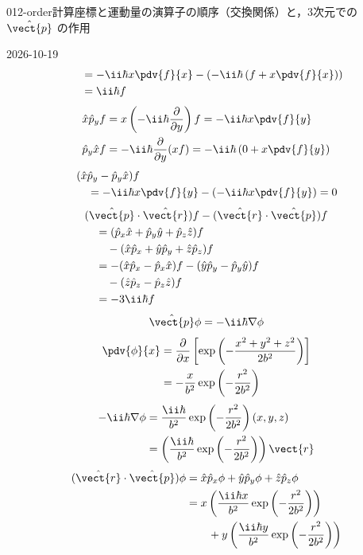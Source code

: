 \documentclass[uplatex,dvipdfmx,a4paper,11pt]{jsarticle}
\begin{document}
\begin{mondai}{012-order}{計算}{座標と運動量の演算子の順序（交換関係）と，3次元での $\hat{\vect{p}}$ の作用}
\begin{kotaeutsushi}{2026-10-19}
\begin{align*}
&\quad=-\ii\hbar x\pdv{f}{x}-\left(-\ii\hbar\left(f+x\pdv{f}{x}\right)\right)\\
&\quad=\ii\hbar f
\end{align*}
\begin{align*}
\hat{x}\hat{p}_{y}f&=x\left(-\ii\hbar\frac{\partial}{\partial y}\right)f=-\ii\hbar x\pdv{f}{y}\\
\hat{p}_{y}\hat{x}f&=-\ii\hbar\frac{\partial}{\partial y}(xf)=-\ii\hbar\left(0+x\pdv{f}{y}\right)
\end{align*}
\begin{align*}
&(\hat{x}\hat{p}_{y}-\hat{p}_{y}\hat{x})f\\
&\quad=-\ii\hbar x\pdv{f}{y}-\left(-\ii\hbar x\pdv{f}{y}\right)=0
\end{align*}
\begin{align*}
&(\hat{\vect{p}}\cdot\hat{\vect{r}})f-(\hat{\vect{r}}\cdot\hat{\vect{p}})f\\
&\quad=(\hat{p}_{x}\hat{x}+\hat{p}_{y}\hat{y}+\hat{p}_{z}\hat{z})f\\
&\qquad-(\hat{x}\hat{p}_{x}+\hat{y}\hat{p}_{y}+\hat{z}\hat{p}_{z})f\\
&\quad=-(\hat{x}\hat{p}_{x}-\hat{p}_{x}\hat{x})f-(\hat{y}\hat{p}_{y}-\hat{p}_{y}\hat{y})f\\
&\qquad-(\hat{z}\hat{p}_{z}-\hat{p}_{z}\hat{z})f\\
&\quad=-3\ii\hbar f
\end{align*}
\[ \hat{\vect{p}}\phi=-\ii\hbar\nabla\phi \]
\begin{align*}
\pdv{\phi}{x}&=\frac{\partial}{\partial x}\left[\exp\left(-\frac{x^{2}+y^{2}+z^{2}}{2b^{2}}\right)\right]\\
&=-\frac{x}{b^{2}}\exp\left(-\frac{r^{2}}{2b^{2}}\right)
\end{align*}
\begin{align*}
-\ii\hbar\nabla\phi&=\frac{\ii\hbar}{b^{2}}\exp\left(-\frac{r^{2}}{2b^{2}}\right)(x,y,z)\\
&=\left(\frac{\ii\hbar}{b^{2}}\exp\left(-\frac{r^{2}}{2b^{2}}\right)\right)\vect{r}
\end{align*}
\begin{align*}
(\hat{\vect{r}}\cdot\hat{\vect{p}})\phi&=\hat{x}\hat{p}_{x}\phi+\hat{y}\hat{p}_{y}\phi+\hat{z}\hat{p}_{z}\phi\\
&=x\left(\frac{\ii\hbar x}{b^{2}}\exp\left(-\frac{r^{2}}{2b^{2}}\right)\right)\\
&\qquad+y\left(\frac{\ii\hbar y}{b^{2}}\exp\left(-\frac{r^{2}}{2b^{2}}\right)\right)\\

\end{align*}
\end{kotaeutsushi}
\end{mondai}
\end{document}
